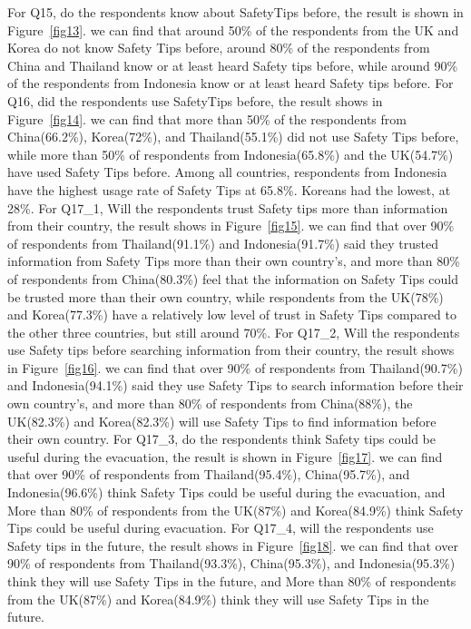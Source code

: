 For Q15, do the respondents know about SafetyTips before, the result is shown in Figure~\ref{fig13}. we can find that around 50\% of the respondents from the UK and Korea do not know Safety Tips before, around 80\% of the respondents from China and Thailand know or at least heard Safety tips before, while around 90\% of the respondents from Indonesia know or at least heard Safety tips before. For Q16, did the respondents use SafetyTips before, the result shows in Figure~\ref{fig14}. we can find that more than 50\% of the respondents from China(66.2\%), Korea(72\%), and Thailand(55.1\%) did not use Safety Tips before, while more than 50\% of respondents from Indonesia(65.8\%) and the UK(54.7\%) have used Safety Tips before. Among all countries, respondents from Indonesia have the highest usage rate of Safety Tips at 65.8\%. Koreans had the lowest, at 28\%. For Q17\_1, Will the respondents trust Safety tips more than information from their country, the result shows in Figure~\ref{fig15}. we can find that over 90\% of respondents from Thailand(91.1\%) and Indonesia(91.7\%) said they trusted information from Safety Tips more than their own country's, and more than 80\% of respondents from China(80.3\%) feel that the information on Safety Tips could be trusted more than their own country, while respondents from the UK(78\%) and Korea(77.3\%) have a relatively low level of trust in Safety Tips compared to the other three countries, but still around 70\%. For Q17\_2, Will the respondents use Safety tips before searching information from their country, the result shows in Figure~\ref{fig16}. we can find that over 90\% of respondents from Thailand(90.7\%) and Indonesia(94.1\%) said they use Safety Tips to search information before their own country's, and more than 80\% of respondents from China(88\%), the UK(82.3\%) and Korea(82.3\%) will use Safety Tips to find information before their own country. For Q17\_3, do the respondents think Safety tips could be useful during the evacuation, the result is shown in Figure~\ref{fig17}. we can find that over 90\% of respondents from Thailand(95.4\%), China(95.7\%), and Indonesia(96.6\%) think Safety Tips could be useful during the evacuation, and More than 80\% of respondents from the UK(87\%) and Korea(84.9\%) think Safety Tips could be useful during evacuation. For Q17\_4, will the respondents use Safety tips in the future, the result shows in Figure~\ref{fig18}. we can find that over 90\% of respondents from Thailand(93.3\%), China(95.3\%), and Indonesia(95.3\%) think they will use Safety Tips in the future, and More than 80\% of respondents from the UK(87\%) and Korea(84.9\%) think they will use Safety Tips in the future.

